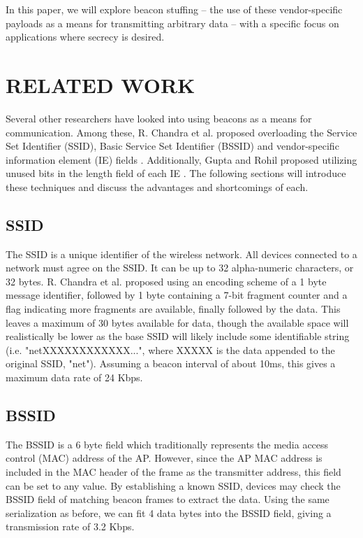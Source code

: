 \documentclass[letterpaper, 10 pt, conference]{ieeeconf}  %
\begin{document}
In this paper, we will explore beacon stuffing -- the use of these vendor-specific payloads as a means for transmitting arbitrary data -- with a specific focus on applications where secrecy is desired.


\section{RELATED WORK}

Several other researchers have looked into using beacons as a means for communication. Among these, R. Chandra et al. proposed overloading the Service Set Identifier (SSID), Basic Service Set Identifier (BSSID) and vendor-specific information element (IE) fields \cite{c1}.  Additionally, Gupta and Rohil proposed utilizing unused bits in the length field of each IE \cite{c2}.  The following sections will introduce these techniques and discuss the advantages and shortcomings of each.

\subsection{SSID}

The SSID is a unique identifier of the wireless network. All devices connected to a network must agree on the SSID.  It can be up to 32 alpha-numeric characters, or 32 bytes. R. Chandra et al. proposed using an encoding scheme of a 1 byte message identifier, followed by 1 byte containing a 7-bit fragment counter and a flag indicating more fragments are available, finally followed by the data.  This leaves a maximum of 30 bytes available for data, though the available space will realistically be lower as the base SSID will likely include some identifiable string (i.e. "netXXXXXXXXXXXX...", where XXXXX is the data appended to the original SSID, "net").  Assuming a beacon interval of about 10ms, this gives a maximum data rate of 24 Kbps.

\subsection{BSSID}

The BSSID is a 6 byte field which traditionally represents the media access control (MAC) address of the AP.  However, since the AP MAC address is included in the MAC header of the frame as the transmitter address, this field can be set to any value. By establishing a known SSID, devices may check the BSSID field of matching beacon frames to extract the data. Using the same serialization as before, we can fit 4 data bytes into the BSSID field, giving a transmission rate of 3.2 Kbps.
\end{document}
